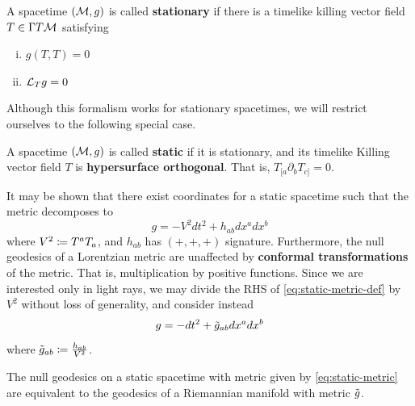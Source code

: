\begin{definition}[]\label{}
A spacetime $(\mathcal{M}, g)$ is called \textbf{stationary} if there is a timelike killing vector field $T \in \Gamma T \mathcal{M}$ satisfying
%
\begin{enumerate}[i)]
  \item $g(T, T) = 0$
  \item $\mathcal{L}_Tg = 0$
\end{enumerate}
\end{definition}
%
Although this formalism works for stationary spacetimes, we will restrict ourselves to the following special case.
%
\begin{definition}[]\label{}
A spacetime $(\mathcal{M}, g)$ is called \textbf{static} if it is stationary, and its timelike Killing vector field $T$ is \textbf{hypersurface orthogonal}. That is, $T_{[a} \partial_b T_{c]} = 0$.
\end{definition}
\begin{remark}\label{}
It may be shown \cite{straumann2012general} that there exist coordinates for a static spacetime such that the metric decomposes to
\begin{equation}\label{eq:static-metric-def}
g = -V^2 dt^2 + h_{ab} dx^a dx^b
\end{equation}
where $V^2 \coloneqq T^a T_a$, and $h_{ab}$ has $(+, +, +)$ signature.
Furthermore, the null geodesics of a Lorentzian metric are unaffected by \textbf{conformal transformations} of the metric. That is, multiplication by positive functions. Since we are interested only in light rays, we may divide the RHS of \cref{eq:static-metric-def} by $V^2$ without loss of generality, and consider instead
\begin{equation}\label{eq:static-metric}
g = -dt^2 + \tilde{g}_{ab} dx^a dx^b
\end{equation}
where $\tilde{g}_{ab} \coloneqq \frac{h_{ab}}{V^2}$.
\end{remark}
\begin{corollary}[]\label{}
The null geodesics on a static spacetime with metric given by \cref{eq:static-metric} are equivalent to the geodesics of a Riemannian manifold with metric $\tilde{g}$.
\end{corollary}
